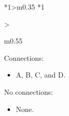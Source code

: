 \documentclass[../../main]{subfiles}
\begin{document}
\begin{center}
\begin{xltabular} {\textwidth} {
            *{1}{>{\centering\arraybackslash}m{0.35\linewidth}}
            *{1}{>{\raggedright\arraybackslash}m{0.55\linewidth}}
        }
        {\begin{minipage} [t] {0.4\linewidth}
            Connections:
            \begin{itemize}
                \setlength\itemsep{1pt}
                \item A, B, C, and D.
            \end{itemize}
        \end{minipage}
        \hfill
        \begin{minipage} [t] {0.4\linewidth}
            No connections:
            \begin{itemize}
                \setlength\itemsep{1pt}
                \item None.
            \end{itemize}
        \end{minipage}}

        \\
        \bottomrule

    \end{xltabular}

    \label{tbl:connectionsInDiagrams}

\end{center}
\end{document}
